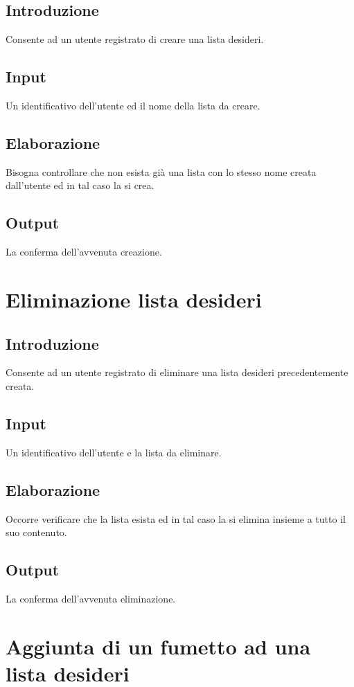 \documentclass{scrreprt}
\begin{document}
\subsection*{Introduzione}
Consente ad un utente registrato di creare una lista desideri.
\subsection*{Input}
Un identificativo dell'utente ed il nome della lista da creare.
\subsection*{Elaborazione}
Bisogna controllare che non esista già una lista con lo stesso nome creata dall'utente ed in tal
caso la si crea.
\subsection*{Output}
La conferma dell'avvenuta creazione.

\section{Eliminazione lista desideri}

\subsection*{Introduzione}
Consente ad un utente registrato di eliminare una lista desideri precedentemente creata.
\subsection*{Input}
Un identificativo dell’utente e la lista da eliminare.
\subsection*{Elaborazione}
Occorre verificare che la lista esista ed in tal caso la si elimina insieme a tutto il suo contenuto.
\subsection*{Output}
La conferma dell'avvenuta eliminazione.

\section{Aggiunta di un fumetto ad una lista desideri}
\end{document}
